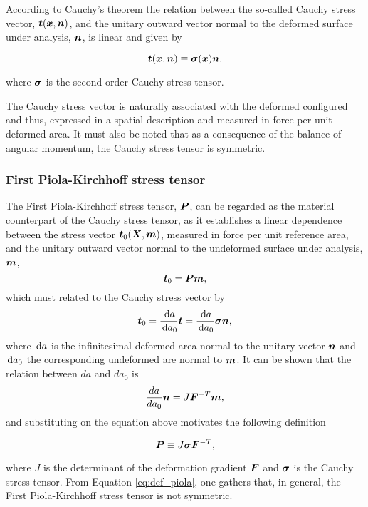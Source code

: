 According to Cauchy's theorem the relation between the so-called Cauchy stress vector, $\bm{t}(\bm{x},\bm{n})$, and the unitary outward vector normal to the deformed surface under analysis, $\bm{n}$, is linear and given by
\begin{highlight}
    \begin{equation}
        \bm{t}(\bm{x},\bm{n})\equiv \bm{\sigma}(\bm{x})\bm{n},
    \end{equation}
\end{highlight}
where $\bm{\sigma}$ is the second order Cauchy stress tensor.

The Cauchy stress vector is naturally associated with the deformed configured and thus, expressed in a spatial description and measured in force per unit deformed area.
It must also be noted that as a consequence of the balance of angular momentum, the Cauchy stress tensor is symmetric.

\subsubsection{First Piola-Kirchhoff stress tensor}

    The First Piola-Kirchhoff stress tensor, $\bm{P}$, can be regarded as the material counterpart of the Cauchy stress tensor, as it establishes a linear dependence between the stress vector $\bm{t}_0(\bm{X},\bm{m})$, measured in force per unit reference area, and the unitary outward vector normal to the undeformed surface under analysis, $\bm{m}$,
    \begin{equation}
        \bm{t}_0 = \bm{P} \bm{m},
    \end{equation}
    which must related to the Cauchy stress vector by
    \begin{equation}
        \bm{t}_0 =\frac{\,\mathrm{d} a}{\,\mathrm{d} a_0} \bm{t} = \frac{\,\mathrm{d} a}{\,\mathrm{d} a_0} \bm{\sigma} \bm{n},
    \end{equation}
    where $\,\mathrm{d} a$ is the infinitesimal deformed area normal to the unitary vector $\bm{n}$ and $\,\mathrm{d} a_0$ the corresponding undeformed are normal to $\bm{m}$.
    It can be shown that the relation between $da$ and $da_0$ is
    \begin{equation}
        \frac{da}{da_0}\bm{n}=J\bm{F}^{-T}\bm{m},
    \end{equation}
    and substituting on the equation above motivates the following definition
    \begin{highlight}
        \begin{equation}
            \bm{P} \equiv J\bm{\sigma} \bm{F}^{-T}, \label{eq:def_piola}
        \end{equation}
    \end{highlight}
     where $J$ is the determinant of the deformation gradient $\bm{F}$ and $\bm{\sigma}$ is the Cauchy stress tensor.
     From Equation \eqref{eq:def_piola}, one gathers that, in general, the First Piola-Kirchhoff stress tensor is not symmetric.


